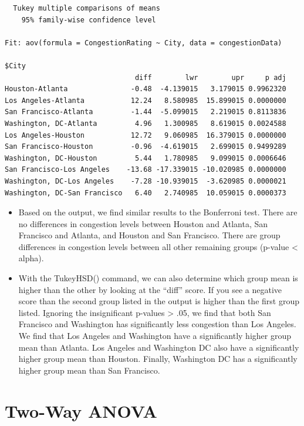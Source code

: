 \documentclass[
  letterpaper,
  DIV=11,
  numbers=noendperiod]{scrreprt}
\begin{document}
\begin{verbatim}
  Tukey multiple comparisons of means
    95% family-wise confidence level

Fit: aov(formula = CongestionRating ~ City, data = congestionData)

$City
                               diff        lwr        upr     p adj
Houston-Atlanta               -0.48  -4.139015   3.179015 0.9962320
Los Angeles-Atlanta           12.24   8.580985  15.899015 0.0000000
San Francisco-Atlanta         -1.44  -5.099015   2.219015 0.8113836
Washington, DC-Atlanta         4.96   1.300985   8.619015 0.0024588
Los Angeles-Houston           12.72   9.060985  16.379015 0.0000000
San Francisco-Houston         -0.96  -4.619015   2.699015 0.9499289
Washington, DC-Houston         5.44   1.780985   9.099015 0.0006646
San Francisco-Los Angeles    -13.68 -17.339015 -10.020985 0.0000000
Washington, DC-Los Angeles    -7.28 -10.939015  -3.620985 0.0000021
Washington, DC-San Francisco   6.40   2.740985  10.059015 0.0000373
\end{verbatim}

\begin{itemize}
\item
  Based on the output, we find similar results to the Bonferroni test.
  There are no differences in congestion levels between Houston and
  Atlanta, San Francisco and Atlanta, and Houston and San Francisco.
  There are group differences in congestion levels between all other
  remaining groups (p-value \textless{} alpha).
\item
  With the TukeyHSD() command, we can also determine which group mean is
  higher than the other by looking at the ``diff'' score. If you see a
  negative score than the second group listed in the output is higher
  than the first group listed. Ignoring the insignificant p-values
  \textgreater{} .05, we find that both San Francisco and Washington has
  significantly less congestion than Los Angeles. We find that Los
  Angeles and Washington have a significantly higher group mean than
  Atlanta. Los Angeles and Washington DC also have a significantly
  higher group mean than Houston. Finally, Washington DC has a
  significantly higher group mean than San Francisco.
\end{itemize}


\chapter{Two-Way ANOVA}\label{two-way-anova}
\end{document}
